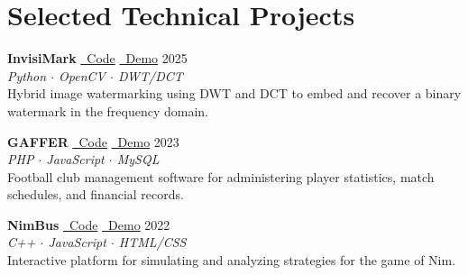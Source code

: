 \documentclass[10pt,letterpaper]{article}
\begin{document}
\section{Selected Technical Projects}
\textbf{InvisiMark}
\quad \href{https://github.com/Aashnan-Rahman/ACADEMIC-PROJECTS/blob/main/ADIP\%20Project/ADIP_Project_v4_3.ipynb}{\faGithub\ Code}
\quad \href{https://academic-projects-three.vercel.app/}{\faGlobe\ Demo}
\hfill 2025\\[-1pt]
{\small\color{mutedColor}\textit{Python $\cdot$ OpenCV $\cdot$ DWT/DCT}}\\[-1pt]
Hybrid image watermarking using DWT and DCT to embed and recover a binary watermark in the frequency domain.

\vspace{5pt}

\textbf{GAFFER}
\quad \href{https://github.com/sanz47/Gaffer}{\faGithub\ Code}
\quad \href{https://gaffer-silk.vercel.app/Gaffer-main/}{\faGlobe\ Demo}
\hfill 2023\\[-1pt]
{\small\color{mutedColor}\textit{PHP $\cdot$ JavaScript $\cdot$ MySQL}}\\[-1pt]
Football club management software for administering player statistics, match schedules, and financial records.

\vspace{5pt}

\textbf{NimBus}
\quad \href{https://github.com/Aashnan-Rahman/ACADEMIC-PROJECTS/tree/main/NimBus-main}{\faGithub\ Code}
\quad \href{https://nimbus-seven-dusky.vercel.app/}{\faGlobe\ Demo}
\hfill 2022\\[-1pt]
{\small\color{mutedColor}\textit{C++ $\cdot$ JavaScript $\cdot$ HTML/CSS}}\\[-1pt]
Interactive platform for simulating and analyzing strategies for the game of Nim.
\end{document}
